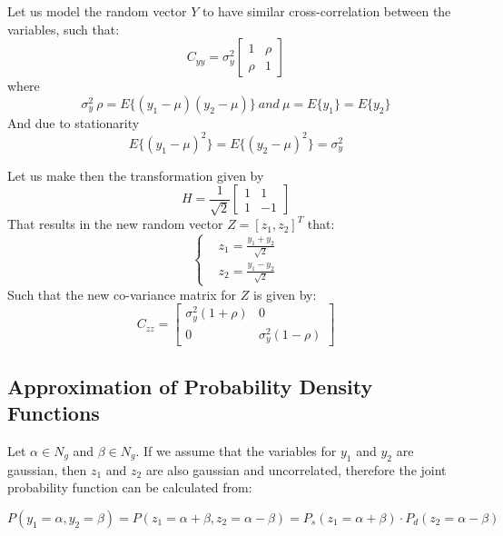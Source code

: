 Let us model the random vector $Y$ to have similar cross-correlation between the variables, such that:
\begin{equation}
    C_{yy} = \sigma_y^2 
    \begin{bmatrix}
    1&\rho\\
    \rho&1
    \end{bmatrix}
\end{equation}{}
where
\begin{equation}
    \sigma_y^2\ \rho = E\{(y_1-\mu)(y_2-\mu)\} \ and \ \mu = E\{y_1\} = E\{y_2\}
\end{equation}{}
And due to stationarity
\begin{equation}
    E\{(y_1-\mu)^2\}=E\{(y_2-\mu)^2\} = \sigma_y^2
\end{equation}{}

Let us make then the transformation given by
\begin{equation}
H =\frac{1}{\sqrt{2}} 
\begin{bmatrix}
1&1\\
1&-1
\end{bmatrix}{}
\end{equation}
That results in the new random vector $Z=[z_1, z_2]^T$ that:
\begin{equation}
\begin{cases}
&z_1 =\frac{y_1+y_2}{\sqrt{2}}\\
&z_2 = \frac{y_1-y_2}{\sqrt{2}}
\end{cases}
\end{equation}
Such that the new co-variance matrix for $Z$ is given by:
\begin{equation}
C_{zz}=
    \begin{bmatrix}
    \sigma_y^2 (1+\rho) & 0\\
    0 & \sigma_y^2 (1-\rho)
    \end{bmatrix}{}
\end{equation}{}

\subsection{Approximation of Probability Density Functions}
Let $\alpha \in N_g$ and $\beta \in N_g$.
If we assume that the variables for $y_1$ and $y_2$ are gaussian, then $z_1$ and $z_2$ are also gaussian and uncorrelated, therefore the joint probability function can be calculated from:

\begin{equation}
P(y_1=\alpha, y_2=\beta) = P(z_1=\alpha + \beta, z_2=\alpha - \beta) = P_s(z_1=\alpha+\beta)\cdot P_d(z_2=\alpha-\beta) 
\end{equation}

